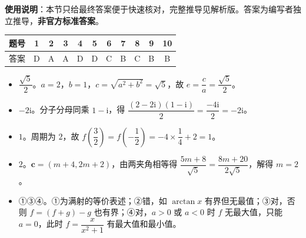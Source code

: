 
\begin{gknotice}
\textbf{使用说明}：本节只给最终答案便于快速核对，完整推导见解析版。答案为编写者独立推导，\textbf{非官方标准答案}。
\end{gknotice}

\begin{center}\begin{tabular}{ccccccccccc}
\toprule
题号 & 1 & 2 & 3 & 4 & 5 & 6 & 7 & 8 & 9 & 10 \\
\midrule
答案 & D & A & A & D & D & C & B & C & B & B \\
\bottomrule
\end{tabular}\end{center}

\begin{itemize}[leftmargin=2.6em]
  \item[\textbf{11.}] $\dfrac{\sqrt5}2$。$a=2$，$b=1$，$c=\sqrt{a^2+b^2}=\sqrt5$，故 $e=\dfrac ca=\dfrac{\sqrt5}2$。
  \item[\textbf{12.}] $-2\mathrm i$。分子分母同乘 $1-\mathrm i$，得 $\dfrac{(2-2\mathrm i)(1-\mathrm i)}2=\dfrac{-4\mathrm i}2=-2\mathrm i$。
  \item[\textbf{13.}] $1$。周期为 $2$，故 $f\left(\dfrac32\right)=f\left(-\dfrac12\right)=-4\times\dfrac14+2=1$。
  \item[\textbf{14.}] $2$。$\boldsymbol c=(m+4,2m+2)$，由两夹角相等得 $\dfrac{5m+8}{\sqrt5}=\dfrac{8m+20}{2\sqrt5}$，解得 $m=2$。
  \item[\textbf{15.}] ①③④。①为满射的等价表述；②错，如 $\arctan x$ 有界但无最值；③对，否则 $f=(f+g)-g$ 也有界；④对，$a>0$ 或 $a<0$ 时 $f$ 无最大值，只能 $a=0$，此时 $f=\dfrac{x}{x^2+1}$ 有最大值和最小值。
\end{itemize}

